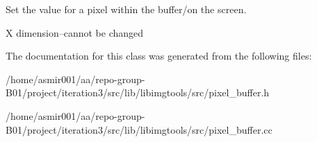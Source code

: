 Set the value for a pixel within the buffer/on the screen. 

X dimension--cannot be changed 

The documentation for this class was generated from the following files\+:\begin{DoxyCompactItemize}
\item 
/home/asmir001/aa/repo-\/group-\/\+B01/project/iteration3/src/lib/libimgtools/src/pixel\+\_\+buffer.\+h\item 
/home/asmir001/aa/repo-\/group-\/\+B01/project/iteration3/src/lib/libimgtools/src/pixel\+\_\+buffer.\+cc\end{DoxyCompactItemize}
